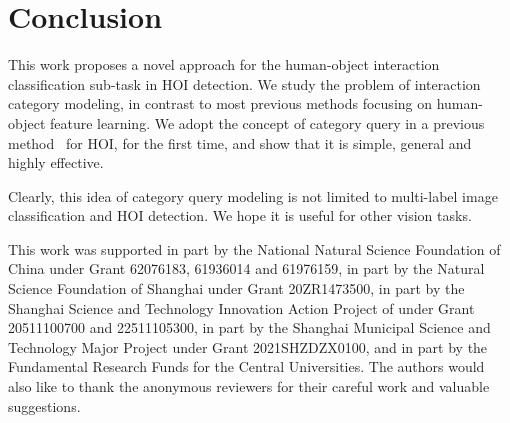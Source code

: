 \documentclass[10pt,twocolumn,letterpaper]{article}
\begin{document}
\section{Conclusion}
This work proposes a novel approach for the human-object interaction classification sub-task in HOI detection. We study the problem of interaction category modeling, in contrast to most previous methods focusing on human-object feature learning. We adopt the concept of category query in a previous method~\cite{liu2021query2label} for HOI, for the first time, and show that it is simple, general and highly effective.

Clearly, this idea of category query modeling is not limited to multi-label image classification and HOI detection. We hope it is useful for other vision tasks.


This work was supported in part by the National Natural Science Foundation of China under Grant 62076183, 61936014 and 61976159, in part by the Natural Science Foundation of Shanghai under Grant 20ZR1473500, in part by the Shanghai Science and Technology Innovation Action Project of under Grant 20511100700 and 22511105300, in part by the Shanghai Municipal Science and Technology Major Project under Grant 2021SHZDZX0100, and in part by the Fundamental Research Funds for the Central Universities. The authors would also like to thank the anonymous reviewers for their careful work and valuable suggestions.


{\small


}
\end{document}
